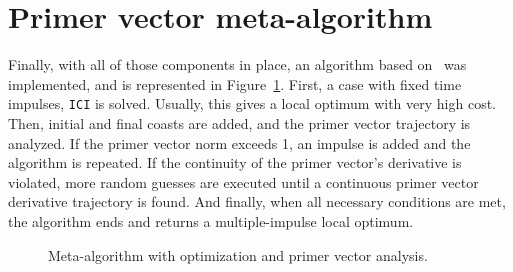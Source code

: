 


\section{Primer vector meta-algorithm}\label{sec:impulsive_statement}

Finally, with all of those components in place, an algorithm based on~ was implemented, and is represented in Figure~\ref{fig:meta_alg}. First, a case with fixed time impulses, \texttt{ICI} is solved. Usually, this gives a local optimum with very high cost. Then, initial and final coasts are added, and the primer vector trajectory is analyzed. If the primer vector norm exceeds 1, an impulse is added and the algorithm is repeated. If the continuity of the primer vector's derivative is violated, more random guesses are executed until a continuous primer vector derivative trajectory is found. And finally, when all necessary conditions are met, the algorithm ends and returns a multiple-impulse local optimum.

\begin{figure}[htbp]
    \centering
    \caption{Meta-algorithm with optimization and primer vector analysis.}
    \label{fig:meta_alg}
\end{figure}
